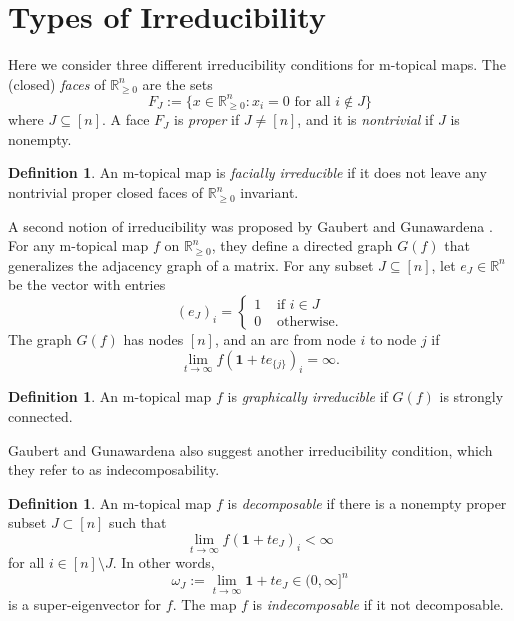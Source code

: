 \documentclass[10pt,reqno]{amsart}
\newcommand{\R}{\mathbb{R}}
\newcommand{\bs}{\setminus}
\theoremstyle{plain}
\theoremstyle{definition}
\newtheorem{definition}[theorem]{Definition}
\numberwithin{equation}{section}
\begin{document}
\section{Types of Irreducibility} \label{sec:types}

Here we consider three different irreducibility conditions for m-topical maps. The (closed) \emph{faces} of $\R^n_{\ge 0}$ are the sets 
\begin{equation} \label{eq:face}
F_J := \{ x \in \R^n_{\ge 0} : x_i = 0 \text{ for all } i \notin J \}
\end{equation}
where $J \subseteq [n]$. A face $F_J$ is \emph{proper} if $J \neq [n]$, and it is \emph{nontrivial} if $J$ is nonempty. 


\begin{definition} \label{def:facial}
An m-topical map is \emph{facially irreducible} if it does not leave any nontrivial proper closed faces of $\R^n_{\ge 0}$ invariant. 
\end{definition}

A second notion of irreducibility was proposed by Gaubert and Gunawardena \cite{GaubertGunawardena04}. For any m-topical map $f$ on $\R^n_{\ge 0}$, they define a directed graph $G(f)$ that generalizes the adjacency graph of a matrix.  For any subset $J \subseteq [n]$, let $e_J \in \R^n$ be the vector with entries
$$(e_J)_i = \begin{cases} 
1 & \text{ if } i \in J \\
0 & \text{ otherwise.} \end{cases}$$ 
The graph $G(f)$ has nodes $[n]$, and an arc from node $i$ to node $j$ if 
$$\lim_{t \rightarrow \infty} f(\mathbf{1} + t e_{\{j\}})_i = \infty.$$ 
\begin{definition} \label{def:graphical}
An m-topical map $f$ is \emph{graphically irreducible} if $G(f)$ is strongly connected.  
\end{definition}

Gaubert and Gunawardena \cite{GaubertGunawardena04} also suggest another irreducibility condition, which they refer to as indecomposability.  

\begin{definition} \label{def:indecomposable}
An m-topical map $f$ is \emph{decomposable} if there is a nonempty proper subset $J \subset [n]$ such that $$\lim_{t \rightarrow \infty} f(\mathbf{1} + te_J)_i < \infty$$
for all $i \in [n] \bs J$.  In other words, 
\begin{equation} \label{eq:omega}
\omega_J := \lim_{t \rightarrow \infty} \mathbf{1} + te_J \in (0,\infty]^n
\end{equation} 
is a super-eigenvector for $f$. The map $f$ is \emph{indecomposable} if it not decomposable. 
\end{definition}
\end{document}
